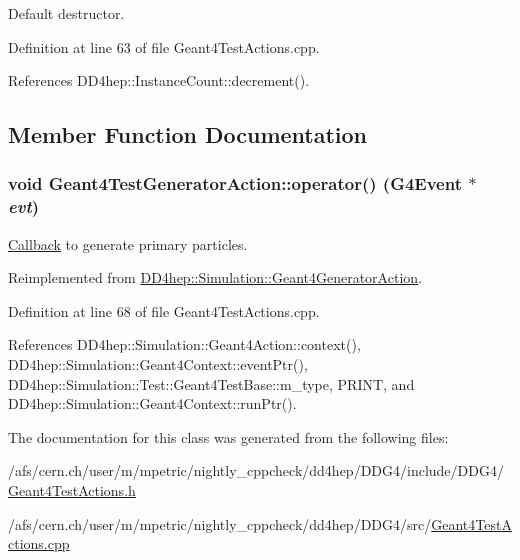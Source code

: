 Default destructor. 

Definition at line 63 of file Geant4TestActions.cpp.

References DD4hep::InstanceCount::decrement().

\subsection{Member Function Documentation}
\hypertarget{class_d_d4hep_1_1_simulation_1_1_test_1_1_geant4_test_generator_action_af50b716c4764ffa0bf42c4b01ee3d394}{
\subsubsection[{operator()}]{\setlength{\rightskip}{0pt plus 5cm}void Geant4TestGeneratorAction::operator() (G4Event $\ast$ {\em evt})}}
\label{class_d_d4hep_1_1_simulation_1_1_test_1_1_geant4_test_generator_action_af50b716c4764ffa0bf42c4b01ee3d394}


\hyperlink{class_d_d4hep_1_1_callback}{Callback} to generate primary particles. 

Reimplemented from \hyperlink{class_d_d4hep_1_1_simulation_1_1_geant4_generator_action_ac5a1d2335a19e3f9d555081199e01801}{DD4hep::Simulation::Geant4GeneratorAction}.

Definition at line 68 of file Geant4TestActions.cpp.

References DD4hep::Simulation::Geant4Action::context(), DD4hep::Simulation::Geant4Context::eventPtr(), DD4hep::Simulation::Test::Geant4TestBase::m\_\-type, PRINT, and DD4hep::Simulation::Geant4Context::runPtr().

The documentation for this class was generated from the following files:\begin{DoxyCompactItemize}
\item 
/afs/cern.ch/user/m/mpetric/nightly\_\-cppcheck/dd4hep/DDG4/include/DDG4/\hyperlink{_geant4_test_actions_8h}{Geant4TestActions.h}\item 
/afs/cern.ch/user/m/mpetric/nightly\_\-cppcheck/dd4hep/DDG4/src/\hyperlink{_geant4_test_actions_8cpp}{Geant4TestActions.cpp}\end{DoxyCompactItemize}

